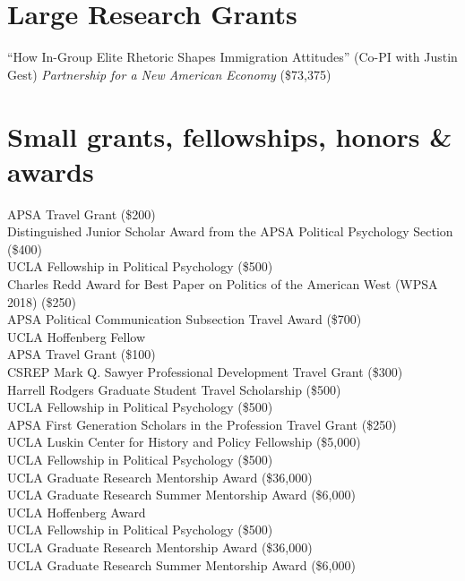 \documentclass[11pt, a4paper]{article}
\newcommand{\years}[1]{\marginnote{\scriptsize #1}}
\begin{document}
\section*{Large Research Grants}

\years{2018}``How In-Group Elite Rhetoric Shapes Immigration Attitudes'' (Co-PI with Justin Gest) \textit{Partnership for a New American Economy} (\$73,375)\\

\section*{Small grants, fellowships, honors \& awards}

\years{2019}APSA Travel Grant (\$200)\\
\years{}Distinguished Junior Scholar Award from the APSA Political Psychology Section (\$400)\\
\years{2018}UCLA Fellowship in Political Psychology (\$500)\\
\years{}Charles Redd Award for Best Paper on Politics of the American West (WPSA 2018) (\$250)\\
\years{}APSA Political Communication Subsection Travel Award (\$700)\\
\years{}UCLA Hoffenberg Fellow\\
\years{}APSA Travel Grant (\$100)\\
\years{}CSREP Mark Q. Sawyer Professional Development Travel Grant (\$300)\\
\years{}Harrell Rodgers Graduate Student Travel Scholarship (\$500)\\
\years{}UCLA Fellowship in Political Psychology (\$500)\\
\years{2017}APSA First Generation Scholars in the Profession Travel Grant (\$250)\\
\years{}UCLA Luskin Center for History and Policy Fellowship (\$5,000)\\
\years{}UCLA Fellowship in Political Psychology (\$500)\\
\years{}UCLA Graduate Research Mentorship Award (\$36,000)\\
\years{}UCLA Graduate Research Summer Mentorship Award (\$6,000)\\
\years{2016}UCLA Hoffenberg Award\\
\years{}UCLA Fellowship in Political Psychology (\$500)\\
\years{}UCLA Graduate Research Mentorship Award (\$36,000)\\
\years{}UCLA Graduate Research Summer Mentorship Award (\$6,000)\\
\end{document}
